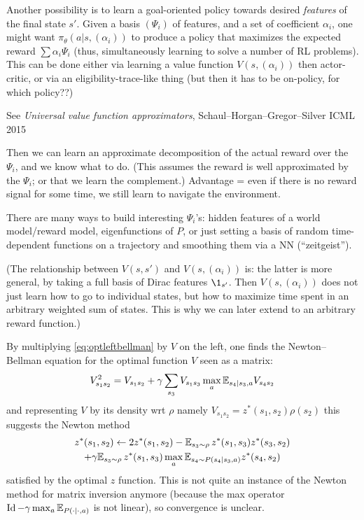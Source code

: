 \documentclass[11pt,a4paper]{article}
\begin{document}
Another possibility is to learn a goal-oriented policy towards desired
\emph{features} of the final state $s'$. Given a basis $(\Psi_i)$ of
features, and a set of coefficient $\alpha_i$, one might want
$\pi_\theta(a|s,(\alpha_i))$ to produce a policy that maximizes the
expected reward $\sum \alpha_i \Psi_i$ (thus, simultaneously learning to
solve a number of RL problems). 
This can be done either via learning a value function $V(s,(\alpha_i))$
then actor-critic, or via an eligibility-trace-like thing (but then it
has to be on-policy, for which policy??)

See \emph{Universal value function approximators},
Schaul--Horgan--Gregor--Silver ICML 2015

Then we can learn an approximate decomposition of the actual reward over
the $\Psi_i$, and we know what to do. (This assumes the reward is well
approximated by the $\Psi_i$; or that we learn the complement.) Advantage
= even if there is no reward signal for some time, we still learn to
navigate the environment.

There are many ways to build interesting
$\Psi_i$'s: hidden features of a world model/reward model, eigenfunctions
of $P$, or just setting a basis of random time-dependent functions on a
trajectory and smoothing them via a NN (``zeitgeist'').

(The relationship between $V(s,s')$ and $V(s,(\alpha_i))$ is: the latter
is more general, by taking a full basis of Dirac features $\1_{s'}$. Then
$V(s,(\alpha_i))$ does not just learn how to go to individual states, but
how to maximize time spent in an arbitrary weighted sum of states. This
is why we can later extend to an arbitrary reward function.)

By multiplying \eqref{eq:optleftbellman} by $V$ on the left, one finds the
Newton--Bellman equation for the optimal function $V$ seen as a matrix:
\begin{equation}
V^2_{s_1s_2}=V_{s_1s_2}+\gamma \sum_{s_3} V_{s_1s_3}\max_a
\mathbb{E}_{s_4|s_3,a} V_{s_4s_2}
\end{equation}
and representing $V$ by its density wrt $\rho$ namely
$V_{s_1s_2}=z^\ast(s_1,s_2)\rho(s_2)$ this suggests the Newton method
\begin{multline}
z^\ast(s_1,s_2)\gets 2z^\ast(s_1,s_2)-\mathbb{E}_{s_3\sim \rho}\,
z^\ast(s_1,s_3)z^\ast(s_3,s_2)\\
+\gamma
\mathbb{E}_{s_3\sim \rho} \,z^\ast(s_1,s_3)\max_a \mathbb{E}_{s_4\sim P(s_4|s_3,a)} z^\ast(s_4,s_2)
\end{multline}
satisfied by the optimal $z$ function. This is not quite an instance of
the Newton method for matrix inversion anymore (because the max operator
$\operatorname{Id}-\gamma \max_a \mathbb{E}_{P(\cdot|\cdot,a)}$ is not linear), so convergence
is unclear.
\end{document}
